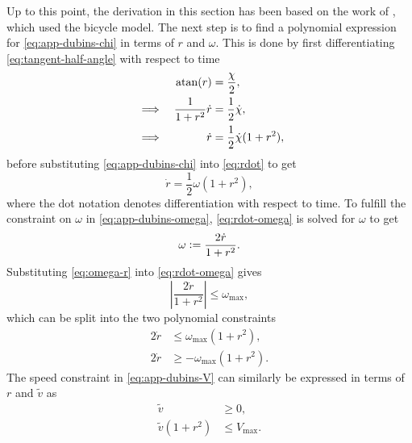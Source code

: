 Up to this point, the derivation in this section has been based on the work of \citet{mercy2017spline}, which used the bicycle model. The next step is to find a polynomial expression for \cref{eq:app-dubins-chi} in terms of $r$ and $\omega$. This is done by first differentiating \cref{eq:tangent-half-angle} with respect to time
\begin{equation}\label{eq:rdot}
    \begin{aligned}
        &&\operatorname{atan}(r) &= \frac{\chi}{2}, \\
        &\implies& \frac{1}{1 + r^2} \dot r &= \frac{1}{2} \dot \chi, \\
        &\implies& \dot r &= \frac{1}{2} \dot \chi (1 + r^2),
    \end{aligned}
\end{equation}
before substituting \cref{eq:app-dubins-chi} into \cref{eq:rdot} to get
\begin{equation}\label{eq:rdot-omega}
    \dot r = \frac{1}{2} \omega (1 + r^2),
\end{equation}
where the dot notation denotes differentiation with respect to time.
To fulfill the constraint on $\omega$ in \cref{eq:app-dubins-omega}, \cref{eq:rdot-omega} is solved for $\omega$ to get
\begin{equation}\label{eq:omega-r}
    \omega \vcentcolon= \frac{2 \dot r}{1 + r^2}.
\end{equation}
Substituting \cref{eq:omega-r} into \cref{eq:rdot-omega} gives
\begin{equation}\label{eq:rdot-omega-r}
    \left|\frac{2 \dot r}{1 + r^2}\right| \leq \omega_{\max},
\end{equation}
which can be split into the two polynomial constraints
\begin{subequations}\label{eq:rdot-omega-r-constraints}
    \begin{align}
        2 \dot r &\leq \omega_{\max} (1 + r^2), \label{eq:rdot-omega-r-constraint1} \\
        2 \dot r &\geq -\omega_{\max} (1 + r^2). \label{eq:rdot-omega-r-constraint2}
    \end{align}
\end{subequations}
The speed constraint in \cref{eq:app-dubins-V} can similarly be expressed in terms of $r$ and $\tilde v$ as
\begin{subequations}\label{eq:V-r}
    \begin{align}
        \tilde v &\ge 0, \\
        \tilde v (1 + r^2) &\leq V_{\max}.
    \end{align}
\end{subequations}

